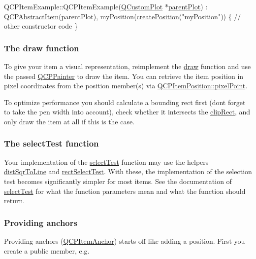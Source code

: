 \begin{DoxyCode}
QCPItemExample::QCPItemExample(\hyperlink{class_q_custom_plot}{QCustomPlot} *\hyperlink{class_q_c_p_layerable_ab7e0e94461566093d36ffc0f5312b109}{parentPlot}) :
  \hyperlink{class_q_c_p_abstract_item}{QCPAbstractItem}(parentPlot),
  myPosition(\hyperlink{class_q_c_p_abstract_item_a75036d39c4d4e2e1a7dd145fff915d32}{createPosition}(\textcolor{stringliteral}{"myPosition"}))
\{
  \textcolor{comment}{// other constructor code}
\}
\end{DoxyCode}
\hypertarget{class_q_c_p_abstract_item_items-drawing}{}\subsubsection{The draw function}\label{class_q_c_p_abstract_item_items-drawing}
To give your item a visual representation, reimplement the \hyperlink{class_q_c_p_abstract_item_ad0dc056f650c3ca73414e6b4f01674ef}{draw} function and use the passed \hyperlink{class_q_c_p_painter}{Q\+C\+P\+Painter} to draw the item. You can retrieve the item position in pixel coordinates from the position member(s) via \hyperlink{class_q_c_p_item_position_ae490f9c76ee2ba33752c495d3b6e8fb5}{Q\+C\+P\+Item\+Position\+::pixel\+Point}.

To optimize performance you should calculate a bounding rect first (don\textquotesingle{}t forget to take the pen width into account), check whether it intersects the \hyperlink{class_q_c_p_abstract_item_a538e25ff8856534582f5b2b400a46405}{clip\+Rect}, and only draw the item at all if this is the case.\hypertarget{class_q_c_p_abstract_item_items-selection}{}\subsubsection{The select\+Test function}\label{class_q_c_p_abstract_item_items-selection}
Your implementation of the \hyperlink{class_q_c_p_abstract_item_a96d522d10ffc0413b9a366c6f7f0476b}{select\+Test} function may use the helpers \hyperlink{class_q_c_p_abstract_item_acdca343717d625b8abb3c3e38c0ed39d}{dist\+Sqr\+To\+Line} and \hyperlink{class_q_c_p_abstract_item_a4c0e14c4e92df91174cb7183fb363069}{rect\+Select\+Test}. With these, the implementation of the selection test becomes significantly simpler for most items. See the documentation of \hyperlink{class_q_c_p_abstract_item_a96d522d10ffc0413b9a366c6f7f0476b}{select\+Test} for what the function parameters mean and what the function should return.\hypertarget{class_q_c_p_abstract_item_anchors}{}\subsubsection{Providing anchors}\label{class_q_c_p_abstract_item_anchors}
Providing anchors (\hyperlink{class_q_c_p_item_anchor}{Q\+C\+P\+Item\+Anchor}) starts off like adding a position. First you create a public member, e.\+g.


